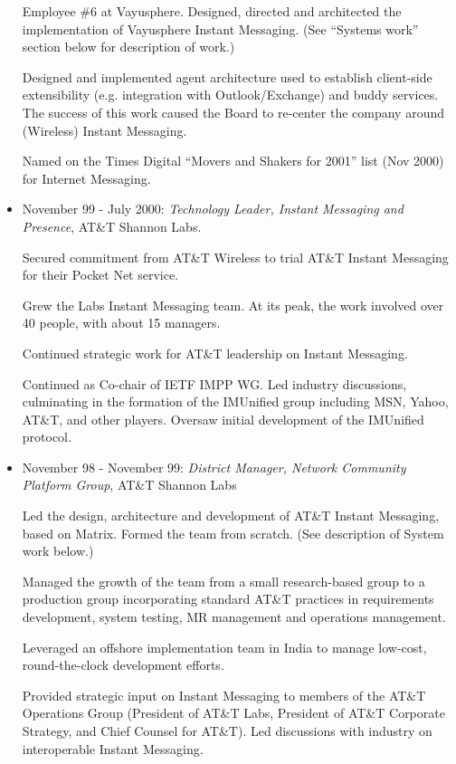 \documentclass{article}
\begin{document}
\begin{itemize}
  Employee \#6 at Vayusphere. Designed, directed and architected the
  implementation of Vayusphere Instant Messaging. (See ``Systems
  work'' section below for description of work.)

  Designed and implemented agent architecture used to establish
  client-side extensibility (e.g. integration with Outlook/Exchange)
  and buddy services. The success of this work caused the Board to
  re-center the company around (Wireless) Instant Messaging.
  
  Named on the Times Digital ``Movers and Shakers for 2001'' list (Nov
  2000) for Internet Messaging.
  
\item November 99 - July 2000: 
  {\em Technology Leader, Instant Messaging and Presence}, AT\&T Shannon
  Labs.

  Secured commitment from AT\&T Wireless to trial AT\&T Instant
  Messaging for their Pocket Net service. 

  Grew the Labs Instant Messaging team. At its peak, the work
  involved over 40 people, with about 15 managers.

  Continued strategic work for AT\&T leadership on Instant
  Messaging. 

  Continued as Co-chair of IETF IMPP WG. Led industry discussions,
  culminating in the formation of the IMUnified group including MSN,
  Yahoo, AT\&T, and other players. Oversaw initial development of the
  IMUnified protocol.

\item November 98 - November 99: 
  {\em District Manager, Network Community Platform Group}, AT\&T
  Shannon Labs

  Led the design, architecture and development of AT\&T Instant
  Messaging, based on Matrix. Formed the team from scratch. (See
  description of System work below.)

  Managed the growth of the team from a small research-based group to
  a production group incorporating standard AT\&T practices in
  requirements development, system testing, MR management and
  operations management.

  Leveraged an offshore implementation team in India to manage
  low-cost, round-the-clock development efforts.

  Provided strategic input on Instant Messaging to members of the
  AT\&T Operations Group (President of AT\&T Labs, President of
  AT\&T Corporate Strategy, and Chief Counsel for AT\&T). Led
  discussions with industry on interoperable Instant Messaging.


\end{itemize}
\end{document}
